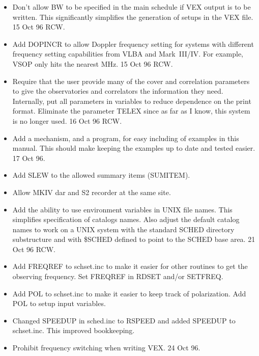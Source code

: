 \documentclass{report}
\begin{document}
\begin{itemize}
\item Don't allow BW to be specified in the main schedule if VEX
      output is to be written.  This significantly simplifies the
      generation of setups in the VEX file.  15 Oct 96 RCW.

\item Add DOPINCR to allow Doppler frequency setting for systems
      with different frequency setting capabilities from VLBA and
      Mark~III/IV.  For example, VSOP only hits the nearest MHz.
      15 Oct 96 RCW.

\item Require that the user provide many of the cover and correlation
      parameters to give the observatories and correlators the
      information they need.   Internally, put all
      parameters in variables to reduce dependence on the print format.
      Eliminate the parameter TELEX since as far as I know, this
      system is no longer used.  16 Oct 96  RCW.

\item Add a mechanism, and a program, for easy including of examples
      in this manual.  This should make keeping the examples up to
      date and tested easier.  17 Oct 96.

\item Add SLEW to the allowed summary items (SUMITEM).

\item Allow MKIV dar and S2 recorder at the same site.

\item Add the ability to use environment variables in UNIX file names.
      This simplifies specification of catalogs names.  Also adjust
      the default catalog names to work on a UNIX system with the
      standard SCHED directory substructure and with \$SCHED defined
      to point to the SCHED base area.   21 Oct 96  RCW.

\item Add FREQREF to schset.inc to make it easier for other routines
      to get the observing frequency.  Set FREQREF in RDSET and/or
      SETFREQ.

\item Add POL to schset.inc to make it easier to keep track of
      polarization.  Add POL to setup input variables.

\item Changed SPEEDUP in sched.inc to RSPEED and added SPEEDUP to
      schset.inc.  This improved bookkeeping.

\item Prohibit frequency switching when writing VEX.  24 Oct 96.


\end{itemize}
\end{document}

